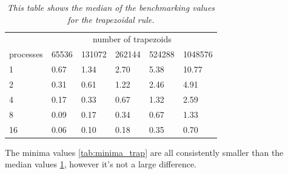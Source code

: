 \documentclass[a4paper,11pt,twoside]{article}
\begin{document}
\begin{table}[]
\centering
\caption{\textit{This table shows the median of the benchmarking values for the trapezoidal rule.}}
\label{tab:median_trap}
\begin{tabular}{llllll}
\multicolumn{1}{l|}{}          & \multicolumn{5}{c}{number of trapezoids}                                                                                       \\ \cline{2-6} 
\multicolumn{1}{l|}{processes} & \multicolumn{1}{l|}{65536} & \multicolumn{1}{l|}{131072} & \multicolumn{1}{l|}{262144} & \multicolumn{1}{l|}{524288} & 1048576 \\ \hline
1                              & 0.67                       & 1.34                        & 2.70                        & 5.38                        & 10.77   \\
2                              & 0.31                       & 0.61                        & 1.22                        & 2.46                        & 4.91    \\
4                              & 0.17                       & 0.33                        & 0.67                        & 1.32                        & 2.59    \\
8                              & 0.09                       & 0.17                        & 0.34                        & 0.67                        & 1.33    \\
16                             & 0.06                       & 0.10                        & 0.18                        & 0.35                        & 0.70   
\end{tabular}
\end{table}

The minima values \ref{tab:minima_trap} are all consistently smaller than the median values \ref{tab:median_trap}, however it's not a large difference. 
\end{document}
